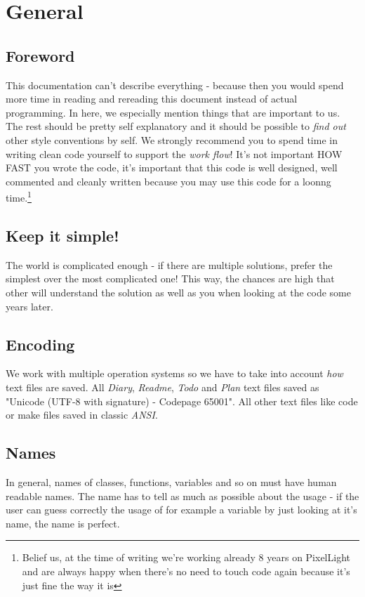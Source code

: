 \chapter{General}




\section{Foreword}
This documentation can't describe everything - because then you would spend more time in reading and rereading this document instead of actual programming. In here, we especially mention things that are important to us. The rest should be pretty self explanatory and it should be possible to \emph{find out} other style conventions by self. We strongly recommend you to spend time in writing clean code yourself to support the \emph{work flow}! It's not important HOW FAST you wrote the code, it's important that this code is well designed, well commented and cleanly written because you may use this code for a loonng time.\footnote{Belief us, at the time of writing we're working already 8 years on PixelLight and are always happy when there's no need to touch code again because it's just fine the way it is}




\section{Keep it simple!}
The world is complicated enough - if there are multiple solutions, prefer the simplest over the most complicated one! This way, the chances are high that other will understand the solution as well as you when looking at the code some years later.




\section{Encoding}
We work with multiple operation systems so we have to take into account \emph{how} text files are saved. All \emph{Diary}, \emph{Readme}, \emph{Todo} and \emph{Plan} text files saved as "Unicode (UTF-8 with signature) - Codepage 65001". All other text files like code or make files saved in classic \emph{ANSI}.




\section{Names}
In general, names of classes, functions, variables and so on must have human readable names. The name has to tell as much as possible about the usage - if the user can guess correctly the usage of for example a variable by just looking at it's name, the name is perfect.

